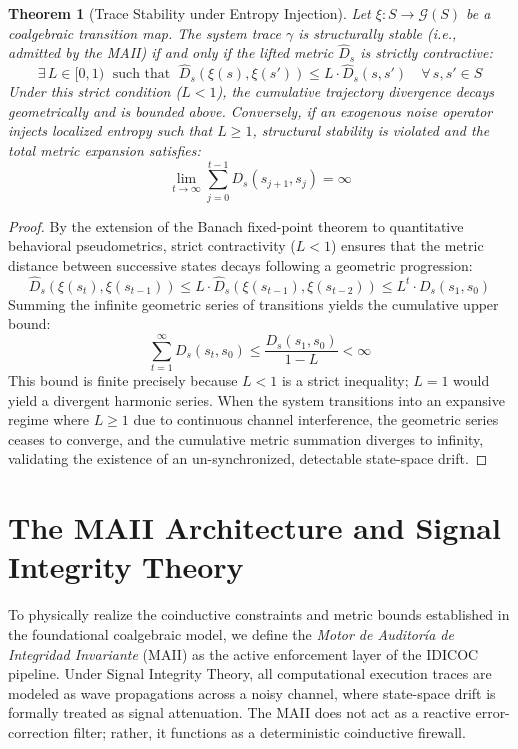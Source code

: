 \documentclass[11pt,a4paper]{article}
\newtheorem{theorem}{Theorem}[section]
\begin{document}
\begin{theorem}[Trace Stability under Entropy Injection]
Let $\xi: S \to \mathcal{G}(S)$ be a coalgebraic transition map. The system trace $\gamma$ is \emph{structurally stable} (i.e., admitted by the MAII) if and only if the lifted metric $\hat{D}_s$ is strictly contractive:
\begin{equation}
    \exists\, L \in [0, 1) \;\text{ such that }\; \hat{D}_s(\xi(s), \xi(s')) \le L \cdot \hat{D}_s(s, s') \quad \forall\, s, s' \in S
\end{equation}
Under this strict condition ($L < 1$), the cumulative trajectory divergence decays geometrically and is bounded above. Conversely, if an exogenous noise operator injects localized entropy such that $L \ge 1$, structural stability is violated and the total metric expansion satisfies:
\begin{equation}
    \lim_{t \to \infty} \sum_{j=0}^{t-1} D_s(s_{j+1}, s_j) = \infty
\end{equation}
\end{theorem}

\begin{proof}
By the extension of the Banach fixed-point theorem to quantitative behavioral pseudometrics, strict contractivity ($L < 1$) ensures that the metric distance between successive states decays following a geometric progression:
\begin{equation}
    \hat{D}_s(\xi(s_t), \xi(s_{t-1})) \le L \cdot \hat{D}_s(\xi(s_{t-1}), \xi(s_{t-2})) \le L^t \cdot D_s(s_1, s_0)
\end{equation}
Summing the infinite geometric series of transitions yields the cumulative upper bound:
\begin{equation}
    \sum_{t=1}^{\infty} D_s(s_t, s_0) \le \frac{D_s(s_1, s_0)}{1-L} < \infty
\end{equation}
This bound is finite precisely because $L < 1$ is a strict inequality; $L = 1$ would yield a divergent harmonic series. When the system transitions into an expansive regime where $L \ge 1$ due to continuous channel interference, the geometric series ceases to converge, and the cumulative metric summation diverges to infinity, validating the existence of an un-synchronized, detectable state-space drift.
\end{proof}

\section{The MAII Architecture and Signal Integrity Theory}
To physically realize the coinductive constraints and metric bounds established in the foundational coalgebraic model, we define the \textit{Motor de Auditoría de Integridad Invariante} (MAII) as the active enforcement layer of the IDICOC pipeline. Under Signal Integrity Theory, all computational execution traces are modeled as wave propagations across a noisy channel, where state-space drift is formally treated as signal attenuation. The MAII does not act as a reactive error-correction filter; rather, it functions as a deterministic coinductive firewall.
\end{document}
